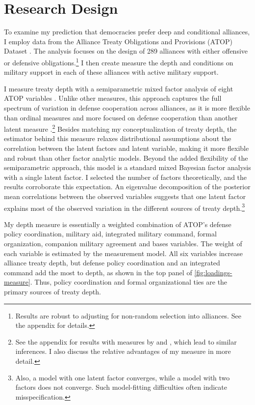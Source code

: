 \documentclass[12pt]{article}
\begin{document}
\section{Research Design}



To examine my prediction that democracies prefer deep and conditional alliances, I employ data from the Alliance Treaty Obligations and Provisions (ATOP) Dataset \citep{Leedsetal2002}. 
The analysis focuses on the design of 289 alliances with either offensive or defensive obligations.\footnote{Results are robust to adjusting for non-random selection into alliances. See the appendix for details.}
I then create measure the depth and conditions on military support in each of these alliances with active military support. 


I measure treaty depth with a semiparametric mixed factor analysis of eight ATOP variables \citep{Murrayetal2013}.
Unlike other measures, this approach captures the full spectrum of variation in defense cooperation across alliances, as it is more flexible than ordinal measures \citep{LeedsAnac2005} and more focused on defense cooperation than another latent measure \citep{BensonClinton2016}.\footnote{See the appendix for results with measures by \citet{LeedsAnac2005} and \citet{BensonClinton2016}, which lead to similar inferences. I also discuss the relative advantages of my measure in more detail.}
Besides matching my conceptualization of treaty depth, the estimator behind this measure relaxes distributional assumptions about the correlation between the latent factors and latent variable, making it more flexible and robust than other factor analytic models. 
Beyond the added flexibility of the semiparametric approach, this model is a standard mixed Bayesian factor analysis with a single latent factor. 
I selected the number of factors theoretically, and the results corroborate this expectation.
An eigenvalue decomposition of the posterior mean correlations between the observed variables suggests that one latent factor explains most of the observed variation in the different sources of treaty depth.\footnote{Also, a model with one latent factor converges, while a model with two factors does not converge. Such model-fitting difficulties often indicate misspecification.} 


My depth measure is essentially a weighted combination of ATOP's defense policy coordination, military aid, integrated military command, formal organization, companion military agreement and bases variables.
The weight of each variable is estimated by the measurement model.  
All six variables increase alliance treaty depth, but defense policy coordination and an integrated command add the most to depth, as shown in the top panel of \autoref{fig:loadings-measure}. 
Thus, policy coordination and formal organizational ties are the primary sources of treaty depth. 
\end{document}

